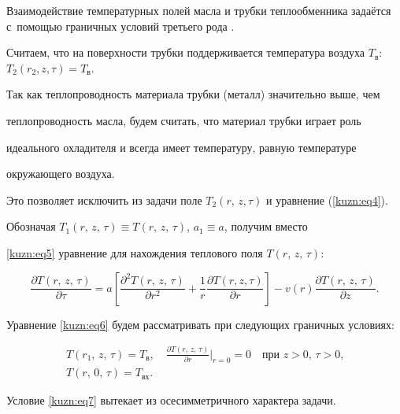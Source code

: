 Взаимодействие температурных полей масла и трубки теплообменника задаётся с~помощью граничных условий третьего рода \cite{kuzn:bib1,kuzn:bib2}.

Считаем, что на поверхности трубки поддерживается температура воздуха \mbox{$T_\text{в}$: $T_2(r_2, z, \tau) = T_\text{в}$.}



Так как теплопроводность материала трубки (металл) значительно выше, чем

теплопроводность масла, будем считать, что материал трубки играет роль

идеального охладителя и всегда имеет температуру, равную температуре

окружающего воздуха. 

Это позволяет исключить из задачи поле $T_2(r,\,z,\tau)$ и уравнение (\ref{kuzn:eq4}).

Обозначая $T_1(r,\,z,\,\tau) \equiv  T(r,\,z,\,\tau )$, $a_1 \equiv a$, получим вместо

\eqref{kuzn:eq5} уравнение для нахождения теплового поля $T(r,\,z,\,\tau)$:

\begin{equation}

\label{kuzn:eq6}

\frac{\partial T(r,\,z,\,\tau)}{\partial \tau

}=a\left[ \frac{\partial^2 T(r,\,z,\,\tau)}{\partial

r^2}+\frac{1}{r}\frac{\partial T(r,z,\tau )}{\partial r}\right]

-v(r)\frac{\partial T(r,\,z,\,\tau)}{\partial z}.

\end{equation}

Уравнение \eqref{kuzn:eq6} будем рассматривать при следующих граничных условиях:

\begin{gather}

\label{kuzn:eq7}

T(r_1,\,z,\,\tau) = T_\text{в}, \quad \frac{\partial T(r,\,z,\,\tau)}{\partial r}\Bigr|_{r=0} =0

\quad \text{при $z>0$, $\tau >0$,}\\

\label{kuzn:eq8}

T(r,\,0,\,\tau) = T_\text{вх}.

\end{gather}

Условие \eqref{kuzn:eq7} вытекает из осесимметричного характера задачи.

